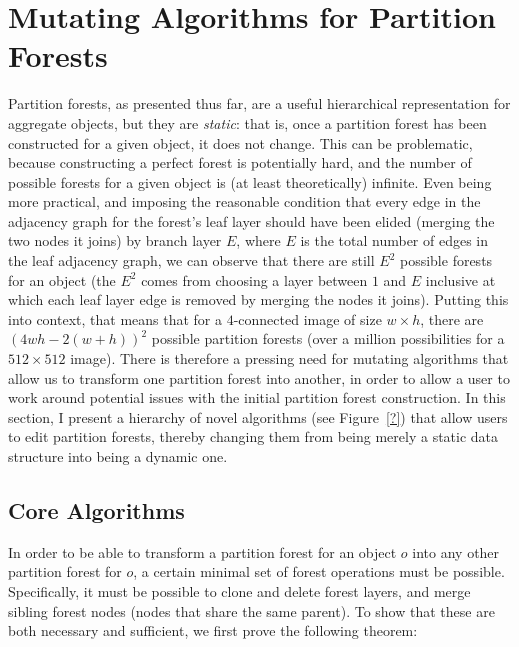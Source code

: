 \section{Mutating Algorithms for Partition Forests}
\label{sec:ipfs-mutatingalgorithms}

Partition forests, as presented thus far, are a useful hierarchical representation for aggregate objects, but they are \emph{static}: that is, once a partition forest has been constructed for a given object, it does not change. This can be problematic, because constructing a perfect forest is potentially hard, and the number of possible forests for a given object is (at least theoretically) infinite. Even being more practical, and imposing the reasonable condition that every edge in the adjacency graph for the forest's leaf layer should have been elided (merging the two nodes it joins) by branch layer $E$, where $E$ is the total number of edges in the leaf adjacency graph, we can observe that there are still $E^2$ possible forests for an object (the $E^2$ comes from choosing a layer between $1$ and $E$ inclusive at which each leaf layer edge is removed by merging the nodes it joins). Putting this into context, that means that for a $4$-connected image of size $w \times h$, there are $(4wh - 2(w+h))^2$ possible partition forests (over a million possibilities for a $512 \times 512$ image). There is therefore a pressing need for mutating algorithms that allow us to transform one partition forest into another, in order to allow a user to work around potential issues with the initial partition forest construction. In this section, I present a hierarchy of novel algorithms (see Figure~\ref{?}) that allow users to edit partition forests, thereby changing them from being merely a static data structure into being a dynamic one.

\subsection{Core Algorithms}

In order to be able to transform a partition forest for an object $o$ into any other partition forest for $o$, a certain minimal set of forest operations must be possible. Specifically, it must be possible to clone and delete forest layers, and merge sibling forest nodes (nodes that share the same parent). To show that these are both necessary and sufficient, we first prove the following theorem:

